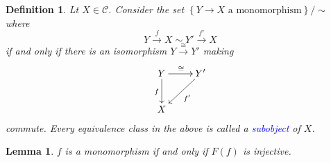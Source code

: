 \documentclass[10pt]{article}
\theoremstyle{thmstyle}
\newtheorem{lemma}[theorem]{Lemma}
\theoremstyle{defstyle}
\newtheorem{definition}[theorem]{Definition}
\newcommand{\scrC}{\mathscr{C}} %
\newcommand{\define}[1]{\textcolor{blue}{\textit{#1}}}
\begin{document}
\begin{definition}
    Lt $X\in\scrC$. Consider the set $\left\{Y\to X\text{ a monomorphism}\right\}/\sim$ where 
    \begin{equation*}
        Y\xrightarrow{f} X\sim Y'\xrightarrow{f'} X
    \end{equation*}
    if and only if there is an isomorphism $Y\xrightarrow{\cong} Y'$ making 
    \begin{equation*}
        \xymatrix {
            Y\ar[d]_f\ar[r]^\cong & Y'\ar[ld]^{f'}\\
            X
        }
    \end{equation*}
    commute. Every equivalence class in the above is called a \define{subobject} of $X$.
\end{definition}

\begin{lemma}
    $f$ is a monomorphism if and only if $F(f)$ is injective.
\end{lemma}
\end{document}
